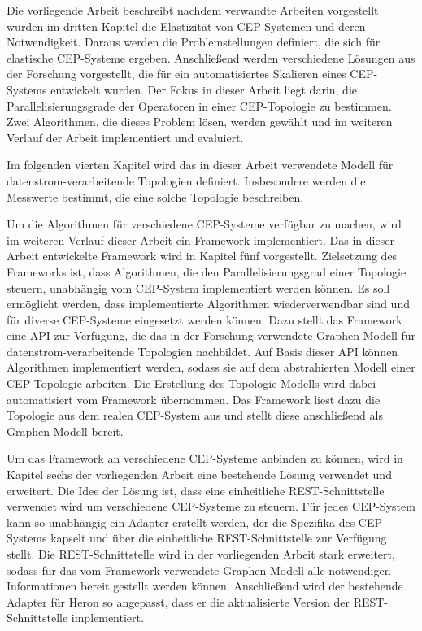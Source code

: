 Die vorliegende Arbeit beschreibt nachdem verwandte Arbeiten vorgestellt wurden im dritten Kapitel die Elastizität von CEP-Systemen und deren Notwendigkeit.
Daraus werden die Problemstellungen definiert, die sich für elastische CEP-Systeme ergeben.
Anschließend werden verschiedene Lösungen aus der Forschung vorgestellt, die für ein automatisiertes Skalieren eines CEP-Systems entwickelt wurden.
Der Fokus in dieser Arbeit liegt darin, die Parallelisierungsgrade der Operatoren in einer CEP-Topologie zu bestimmen.
Zwei Algorithmen, die dieses Problem lösen, werden gewählt und im weiteren Verlauf der Arbeit implementiert und evaluiert.

Im folgenden vierten Kapitel wird das in dieser Arbeit verwendete Modell für datenstrom-verarbeitende Topologien definiert.
Insbesondere werden die Messwerte bestimmt, die eine solche Topologie beschreiben.

Um die Algorithmen für verschiedene CEP-Systeme verfügbar zu machen, wird im weiteren Verlauf dieser Arbeit ein Framework implementiert.
Das in dieser Arbeit entwickelte Framework wird in Kapitel fünf vorgestellt.
Zielsetzung des Frameworks ist, dass Algorithmen, die den Parallelisierungsgrad einer Topologie steuern, unabhängig vom CEP-System implementiert werden können.
Es soll ermöglicht werden, dass implementierte Algorithmen wiederverwendbar sind und für diverse CEP-Systeme eingesetzt werden können.
Dazu stellt das Framework eine API zur Verfügung, die das in der Forschung verwendete Graphen-Modell für datenstrom-verarbeitende Topologien nachbildet.
Auf Basis dieser API können Algorithmen implementiert werden, sodass sie auf dem abstrahierten Modell einer CEP-Topologie arbeiten.
Die Erstellung des Topologie-Modells wird dabei automatisiert vom Framework übernommen.
Das Framework liest dazu die Topologie aus dem realen CEP-System aus und stellt diese anschließend als Graphen-Modell bereit. 

Um das Framework an verschiedene CEP-Systeme anbinden zu können, wird in Kapitel sechs der vorliegenden Arbeit eine bestehende Lösung \cite{goggel_vergleich_2018} verwendet und erweitert.
Die Idee der Lösung ist, dass eine einheitliche REST-Schnittstelle verwendet wird um verschiedene CEP-Systeme zu steuern.
Für jedes CEP-System kann so unabhängig ein Adapter erstellt werden, der die Spezifika des CEP-Systems kapselt und über die einheitliche REST-Schnittstelle zur Verfügung stellt.
Die REST-Schnittstelle wird in der vorliegenden Arbeit stark erweitert, sodass für das vom Framework verwendete Graphen-Modell alle notwendigen Informationen bereit gestellt werden können.
Anschließend wird der bestehende Adapter für Heron so angepasst, dass er die aktualisierte Version der REST-Schnittstelle implementiert.

